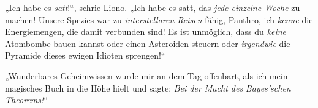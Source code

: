 \clearpage
{}


„Ich habe es \emph{satt}!“, schrie Liono. „Ich habe es satt, das \emph{jede einzelne Woche} zu machen! Unsere Spezies war zu \emph{interstellaren Reisen} fähig, Panthro, ich \emph{kenne} die Energiemengen, die damit verbunden sind! Es ist unmöglich, dass du \emph{keine} Atombombe bauen kannst oder einen Asteroiden steuern oder \emph{irgendwie} die Pyramide dieses ewigen Idioten sprengen!“


\clearpage
{}


„Wunderbares Geheimwissen wurde mir an dem Tag offenbart, als ich mein magisches Buch in die Höhe hielt und sagte: \emph{Bei der Macht des} \emph{Bayes'schen} \emph{Theorems!}“


